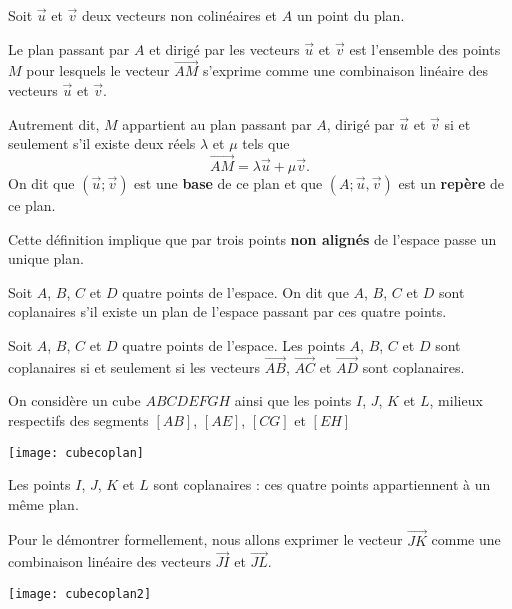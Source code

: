\documentclass[11pt,fleqn, openany]{book} %
\begin{document}
\begin{definition} Soit $\vec u$ et $\vec v$ deux vecteurs non colinéaires et $A$ un point du plan.

Le plan passant par $A$ et dirigé par les vecteurs $\vec u$ et $\vec v$ est l'ensemble des points $M$ pour lesquels le vecteur $\overrightarrow{AM}$ s'exprime comme une combinaison linéaire des vecteurs $\vec u$ et $\vec v$.

Autrement dit, $M$ appartient au plan passant par $A$, dirigé par $\vec u$ et $\vec v$ si et seulement s'il existe deux réels $\lambda$ et $\mu$ tels que 
\[ \overrightarrow{AM}= \lambda \vec u + \mu \vec v .\]
On dit que $(\vec u ; \vec v)$ est une \textbf{base} de ce plan et que $(A ; \vec u, \vec v)$ est un \textbf{repère} de ce plan.\end{definition}

Cette définition implique que par trois points \textbf{non alignés} de l'espace passe un unique plan. 


\newpage
\begin{definition}Soit $A$, $B$, $C$ et $D$ quatre points de l'espace. On dit que $A$, $B$, $C$ et $D$ sont coplanaires s'il existe un plan de l'espace passant par ces quatre points.\end{definition}

\begin{proposition}Soit $A$, $B$, $C$ et $D$ quatre points de l'espace. Les points $A$, $B$, $C$ et $D$ sont coplanaires si et seulement si les vecteurs $\overrightarrow{AB}$, $\overrightarrow{AC}$ et $\overrightarrow{AD}$ sont coplanaires.\end{proposition}

\begin{example}On considère un cube $ABCDEFGH$ ainsi que les points $I$, $J$, $K$ et $L$, milieux respectifs des segments $[AB]$, $[AE]$, $[CG]$ et $[EH]$

\begin{center}
\texttt{[image: cubecoplan]}
\end{center}

Les points $I$, $J$, $K$ et $L$ sont coplanaires : ces quatre points appartiennent à un même plan.

Pour le démontrer formellement, nous allons exprimer le vecteur $\overrightarrow{JK}$ comme une combinaison linéaire des vecteurs $\overrightarrow{JI}$ et $\overrightarrow{JL}$.

\begin{center}
\texttt{[image: cubecoplan2]}
\end{center}

\vskip120pt

\end{example}
\newpage
\end{document}
